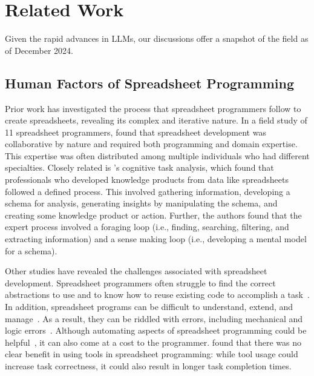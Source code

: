 \section{Related Work}
Given the rapid advances in LLMs, our discussions offer a snapshot of the field as of December 2024.

\subsection{Human Factors of Spreadsheet Programming}
\label{sec:human-factors-of-spreadsheet-programming}
Prior work has investigated the process that spreadsheet programmers follow to create spreadsheets, revealing its complex and iterative nature.
In a field study of 11 spreadsheet programmers, \citet{nardi1991twinkling} found that spreadsheet development was collaborative by nature and required both programming and domain expertise.
This expertise was often distributed among multiple individuals who had different specialties.
Closely related is \citet{pirolli2005sensemaking}'s cognitive task analysis, which found that professionals who developed knowledge products from data like spreadsheets followed a defined process.
This involved gathering information, developing a schema for analysis, generating insights by manipulating the schema, and creating some knowledge product or action.
Further, the authors found that the expert process involved a foraging loop (i.e., finding, searching, filtering, and extracting information) and a sense making loop (i.e., developing a mental model for a schema).

Other studies have revealed the challenges associated with spreadsheet development.
Spreadsheet programmers often struggle to find the correct abstractions to use and to know how to reuse existing code to accomplish a task~\cite{ko2011state}.
In addition, spreadsheet programs can be difficult to understand, extend, and manage~\cite{reschenhofer2015empirical}. 
As a result, they can be riddled with errors, including mechanical and logic errors~\cite{abraham2008spreadsheet}.
Although automating aspects of spreadsheet programming could be helpful~\cite{reschenhofer2015empirical}, it can also come at a cost to the programmer.
\citet{pandita2018no} found that there was no clear benefit in using tools in spreadsheet programming: while tool usage could increase task correctness, it could also result in longer task completion times.

